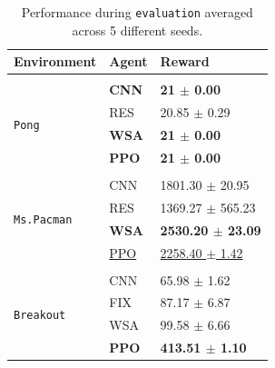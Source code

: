 \begin{table}[ht]
\centering
    \begin{tabular}[b]{lll}
                \multicolumn{1}{l}{Environment}  &\multicolumn{1}{l}{\bf Agent} &\multicolumn{1}{l}{\bf Reward} \\
                \hline \\
                \multirow{4}{*}{\texttt{Pong}} & \textbf{CNN} & \textbf{21 $\pm$ 0.00} \\
                                      & RES & 20.85 $\pm$ 0.29 \\
                                      & \textbf{WSA} & \textbf{21 $\pm$ 0.00} \\
                                      & \textbf{PPO} & \textbf{21 $\pm$ 0.00}\\

                                      \hline \\
                \multirow{4}{*}{\texttt{Ms.Pacman}} & CNN & 1801.30 $\pm$ 20.95 \\
                                      & RES & 1369.27 $\pm$ 565.23 \\
                                      &\textbf{WSA} & \textbf{2530.20 $\pm$ 23.09} \\
                                      & \underline{PPO} & \underline{2258.40 $\pm$ 1.42}\\
                                      \hline \\

                \multirow{4}{*}{\texttt{Breakout}}
                                      & CNN & 65.98 $\pm$ 1.62 \\
                                      & FIX & 87.17 $\pm$ 6.87 \\
                                      & WSA & 99.58 $\pm$ 6.66 \\
                                      & \textbf{PPO} & \textbf{413.51 $\pm$ 1.10}\\
    \end{tabular}
    \caption{Performance during \texttt{evaluation} averaged across 5 different seeds.}
    \label{tab:results}
\end{table}

